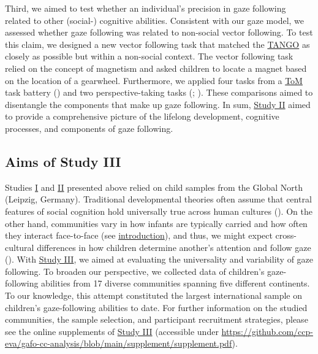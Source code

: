 \documentclass[
]{scrbook}
\begin{document}
Third, we aimed to test whether an individual's precision in gaze following related to other (social-) cognitive abilities. Consistent with our gaze model, we assessed whether gaze following was related to non-social vector following. To test this claim, we designed a new vector following task that matched the \hyperref[acronyms_TANGO]{TANGO} as closely as possible but within a non-social context. The vector following task relied on the concept of magnetism and asked children to locate a magnet based on the location of a gearwheel. Furthermore, we applied four tasks from a \hyperref[acronyms_ToM]{ToM} task battery () and two perspective-taking tasks (; ). These comparisons aimed to disentangle the components that make up gaze following. In sum, \hyperref[studyII]{Study II} aimed to provide a comprehensive picture of the lifelong development, cognitive processes, and components of gaze following.

\subsection{Aims of Study III}\label{aims-studyIII}

Studies \hyperref[studyI]{I} and \hyperref[studyII]{II} presented above relied on child samples from the Global North (Leipzig, Germany). Traditional developmental theories often assume that central features of social cognition hold universally true across human cultures (). On the other hand, communities vary in how infants are typically carried and how often they interact face-to-face (see \hyperref[intro-gaze-cc]{introduction}), and thus, we might expect cross-cultural differences in how children determine another's attention and follow gaze (). With \hyperref[studyIII]{Study III}, we aimed at evaluating the universality and variability of gaze following. To broaden our perspective, we collected data of children's gaze-following abilities from 17 diverse communities spanning five different continents. To our knowledge, this attempt constituted the largest international sample on children's gaze-following abilities to date. For further information on the studied communities, the sample selection, and participant recruitment strategies, please see the online supplements of \hyperref[studyIII]{Study III} (accessible under \url{https://github.com/ccp-eva/gafo-cc-analysis/blob/main/supplement/supplement.pdf}).
\end{document}

